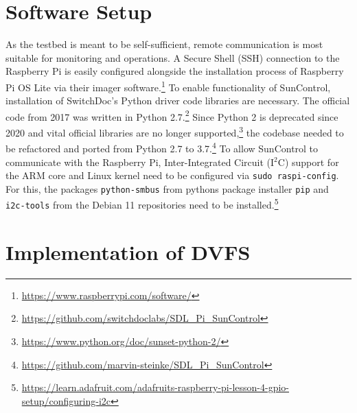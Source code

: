 \section{Software Setup}
\label{sec:software_setup}

As the testbed is meant to be self-sufficient, remote communication is most
suitable for monitoring and operations. A Secure Shell (SSH) connection to the
Raspberry Pi is easily configured alongside the installation process of
Raspberry Pi OS Lite via their imager
software.\footnote{\url{https://www.raspberrypi.com/software/}} To enable
functionality of SunControl, installation of SwitchDoc's Python driver code
libraries are necessary. The official code from 2017 was written in Python
2.7.\footnote{\url{https://github.com/switchdoclabs/SDL_Pi_SunControl}} Since
Python 2 is deprecated since 2020 and vital official libraries are no longer
supported,\footnote{\url{https://www.python.org/doc/sunset-python-2/}} the
codebase needed to be refactored and ported from Python 2.7 to
3.7.\footnote{\url{https://github.com/marvin-steinke/SDL_Pi_SunControl}} To
allow SunControl to communicate with the Raspberry Pi, Inter-Integrated Circuit
(I$^2$C) support for the ARM core and Linux kernel need to be configured via
\texttt{sudo raspi-config}. For this, the packages \texttt{python-smbus} from
pythons package installer \texttt{pip} and \texttt{i2c-tools} from the Debian 11
repositories need to be
installed.\footnote{\url{https://learn.adafruit.com/adafruits-raspberry-pi-lesson-4-gpio-setup/configuring-i2c}}


\section{Implementation of DVFS}
\label{sec:implementation_of_dvfs}

